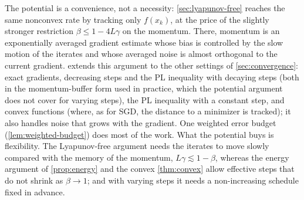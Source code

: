 The potential is a convenience, not a necessity: \cref{sec:lyapunov-free} reaches the same
nonconvex rate by tracking only $f(x_k)$, at the price of the slightly stronger restriction
$\beta\le1-4L\gamma$ on the momentum. There, momentum is an exponentially averaged gradient
estimate whose bias is controlled by the slow motion of the iterates and whose averaged noise
is almost orthogonal to the current gradient.  extends this argument to
the other settings of \cref{sec:convergence}: exact gradients, decreasing steps and the PL
inequality with decaying steps (both in the momentum-buffer form used in practice, which the
potential argument does not cover for varying steps), the PL inequality with a constant
step, and convex functions (where, as for SGD, the distance to a minimizer is tracked); it
also handles noise that grows with the gradient. One weighted error budget
(\cref{lem:weighted-budget}) does most of the work. What the potential buys is flexibility.
The Lyapunov-free argument needs the iterates to move slowly compared with the memory of the
momentum, $L\gamma\lesssim1-\beta$, whereas the energy argument of \cref{prop:energy} and the
convex \cref{thm:convex} allow effective steps that do not shrink as $\beta\to1$; and with
varying steps it needs a non-increasing schedule fixed in advance.
